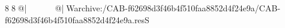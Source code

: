 8  8  @|                                                  @| W   archive:/CAB-f62698d3f46b4f510faa8852d4f24e9a/CAB-f62698d3f46b4f510faa8852d4f24e9a.resS 